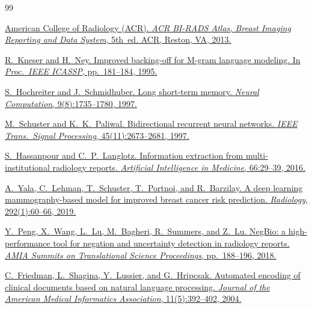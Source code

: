 \documentclass[11pt,a4paper]{article}
\begin{document}
\begin{thebibliography}{99}

\href{https://www.acr.org/Clinical-Resources/Clinical-Tools-and-Reference/Reporting-and-Data-Systems/Bi-Rads}{%
American College of Radiology (ACR).
\textit{ACR BI-RADS Atlas, Breast Imaging Reporting and Data System}, 5th~ed.
ACR, Reston, VA, 2013.}

\href{https://ieeexplore.ieee.org/document/479394}{%
R.~Kneser and H.~Ney.
Improved backing-off for M-gram language modeling.
In \textit{Proc.\ IEEE ICASSP}, pp.~181--184, 1995.}

\href{https://doi.org/10.1162/neco.1997.9.8.1735}{%
S.~Hochreiter and J.~Schmidhuber.
Long short-term memory.
\textit{Neural Computation}, 9(8):1735--1780, 1997.}

\href{https://doi.org/10.1109/78.650093}{%
M.~Schuster and K.~K.~Paliwal.
Bidirectional recurrent neural networks.
\textit{IEEE Trans.\ Signal Processing}, 45(11):2673--2681, 1997.}

\href{https://doi.org/10.1016/j.artmed.2015.09.007}{%
S.~Hassanpour and C.~P.~Langlotz.
Information extraction from multi-institutional radiology reports.
\textit{Artificial Intelligence in Medicine}, 66:29--39, 2016.}

\href{https://doi.org/10.1148/radiol.2019182716}{%
A.~Yala, C.~Lehman, T.~Schuster, T.~Portnoi, and R.~Barzilay.
A deep learning mammography-based model for improved breast cancer risk prediction.
\textit{Radiology}, 292(1):60--66, 2019.}

\href{https://pmc.ncbi.nlm.nih.gov/articles/PMC5961815/}{%
Y.~Peng, X.~Wang, L.~Lu, M.~Bagheri, R.~Summers, and Z.~Lu.
NegBio: a high-performance tool for negation and uncertainty detection in radiology reports.
\textit{AMIA Summits on Translational Science Proceedings}, pp.~188--196, 2018.}

\href{https://doi.org/10.1197/jamia.M1552}{%
C.~Friedman, L.~Shagina, Y.~Lussier, and G.~Hripcsak.
Automated encoding of clinical documents based on natural language processing.
\textit{Journal of the American Medical Informatics Association}, 11(5):392--402, 2004.}


\end{thebibliography}
\end{document}
